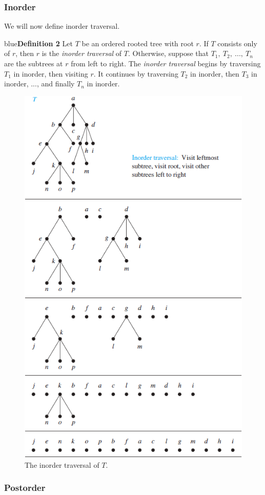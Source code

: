 \documentclass{article}
\begin{document}
\subsubsection{Inorder}

We will now define inorder traversal.

\begin{mybox}{blue}{\textbf{Definition 2}}
Let $T$ be an ordered rooted tree with root $r$. If $T$ consists only of $r$, then $r$ is the \textit{inorder traversal} of $T$. Otherwise, suppose that $T_1,\ T_2,\ ...,\ T_n$ are the subtrees at $r$ from left to right. The \textit{inorder traversal} begins by traversing $T_1$ in inorder, then visiting $r$. It continues by traversing $T_2$ in inorder, then $T_3$ in inorder, ..., and finally $T_n$ in inorder.
\end{mybox}

\begin{figure}[h!]
    \centering
    \includegraphics[width=.7\textwidth]{img/ch11.3-figure6.png}
    \caption{The inorder traversal of $T$.}
    \label{fig:my_label}
\end{figure}

\subsubsection{Postorder}
\end{document}
